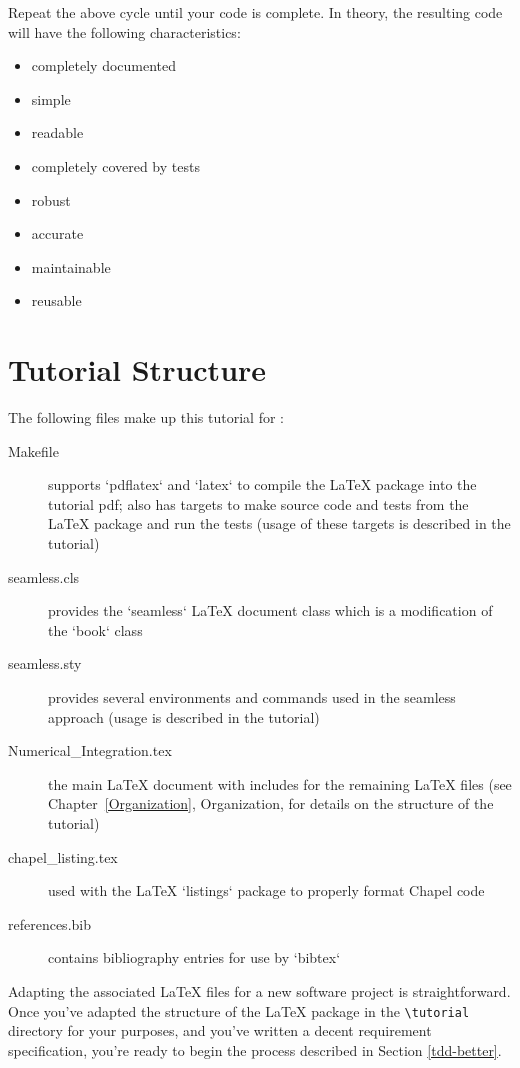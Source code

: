 Repeat the above cycle until your code is complete. In theory, the resulting code will 
have the following characteristics:
\begin{itemize}
  \item completely documented
  \item simple
  \item readable
  \item completely covered by tests
  \item robust
  \item accurate
  \item maintainable
  \item reusable
\end{itemize}

\section{Tutorial Structure}

The following files make up this tutorial for \seamless:
\begin{description}
  \item[Makefile] supports `pdflatex` and `latex` to compile the LaTeX package into the tutorial
    pdf; also has targets to make source code and tests from the LaTeX package and run the tests (usage of these
    targets is described in the tutorial)
  \item[seamless.cls] provides the `seamless` LaTeX document class which is a modification of the `book` class
  \item[seamless.sty] provides several environments and commands used in the seamless approach (usage is described
    in the tutorial)
  \item[Numerical\_Integration.tex] the main LaTeX document with includes for the remaining LaTeX files 
    (see Chapter~\ref{Organization}, Organization, for details on the structure of the tutorial)
  \item[chapel\_listing.tex] used with the LaTeX `listings` package to properly format Chapel code
  \item[references.bib] contains bibliography entries for use by `bibtex`
\end{description}

Adapting the associated \LaTeX\xspace files for a new software project is straightforward. 
Once you've adapted the structure of the \LaTeX\xspace package in the \lstinline{\tutorial} directory for your
purposes, and you've written a decent requirement specification, you're ready to begin the process described in
Section \ref{tdd-better}. 

